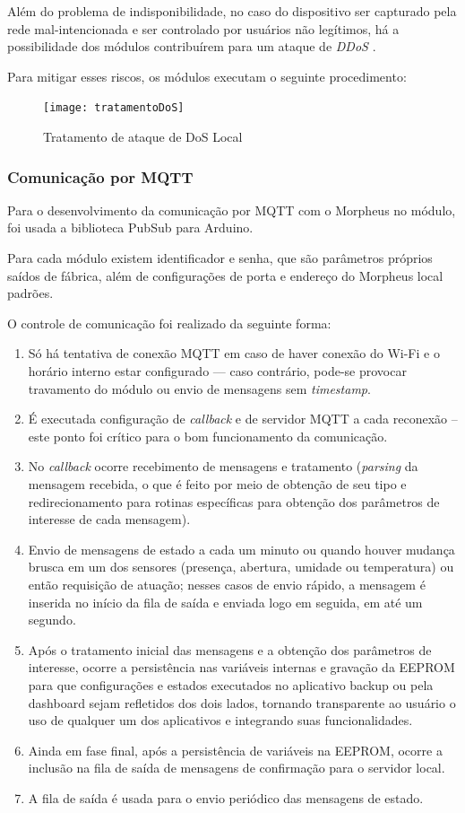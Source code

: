 Além do problema de indisponibilidade, no caso do dispositivo ser capturado pela rede mal-intencionada e ser controlado por usuários não legítimos, há a possibilidade dos módulos contribuírem para um ataque de \textit{DDoS} \cite{OVHDDoS}.

Para mitigar esses riscos, os módulos executam o seguinte procedimento:

\begin{figure}[H]
	\centering
	\caption{Tratamento de ataque de DoS Local}
  \texttt{[image: tratamentoDoS]}
\label{fig:tratamentoDoS}
\end{figure}

\subsubsection{Comunicação por MQTT}
Para o desenvolvimento da comunicação por MQTT com o Morpheus no módulo, foi usada a biblioteca PubSub para Arduino.

Para cada módulo existem identificador e senha, que são parâmetros próprios saídos de fábrica, além de configurações de porta e endereço do Morpheus local padrões.

O controle de comunicação foi realizado da seguinte forma:

\begin{enumerate}
	\item Só há tentativa de conexão MQTT em caso de haver conexão do Wi-Fi e o horário interno estar configurado --- caso contrário, pode-se provocar travamento do módulo ou envio de mensagens sem \emph{timestamp}.
	\item É executada configuração de \emph{callback} e de servidor MQTT a cada reconexão -- este ponto foi crítico para o bom funcionamento da comunicação.
	\item No \emph{callback} ocorre recebimento de mensagens e tratamento (\emph{parsing} da mensagem recebida, o que é feito por meio de obtenção de seu tipo e redirecionamento para rotinas específicas para obtenção dos parâmetros de interesse de cada mensagem).
	\item Envio de mensagens de estado a cada um minuto ou quando houver mudança brusca em um dos sensores (presença, abertura, umidade ou temperatura) ou então requisição de atuação; nesses casos de envio rápido, a mensagem é inserida no início da fila de saída e enviada logo em seguida, em até um segundo.
	\item Após o tratamento inicial das mensagens e a obtenção dos parâmetros de interesse, ocorre a persistência nas variáveis internas e gravação da EEPROM para que configurações e estados executados no aplicativo backup ou pela dashboard sejam refletidos dos dois lados, tornando transparente ao usuário o uso de qualquer um dos aplicativos e integrando suas funcionalidades.
	\item Ainda em fase final, após a persistência de variáveis na EEPROM, ocorre a inclusão na fila de saída de mensagens de confirmação para o servidor local.
	\item A fila de saída é usada para o envio periódico das mensagens de estado.
\end{enumerate}

